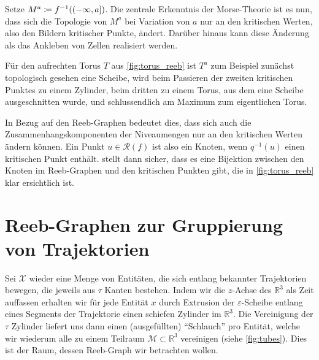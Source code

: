 Setze $M^a \coloneqq f^{-1}\enbrace*{(-\infty,a]}$.
Die zentrale Erkenntnis der Morse-Theorie ist es nun, dass sich die Topologie von $M^a$ bei Variation von $a$ nur an den kritischen Werten, also den Bildern kritischer Punkte, ändert.
Darüber hinaus kann diese Änderung als das Ankleben von Zellen realisiert werden.

Für den aufrechten Torus $T$ aus \cref{fig:torus_reeb} ist $T^a$ zum Beispiel zunächst topologisch gesehen eine Scheibe, wird beim Passieren der zweiten kritischen Punktes zu einem Zylinder, beim dritten zu einem Torus, aus dem eine Scheibe ausgeschnitten wurde, und schlussendlich am Maximum zum eigentlichen Torus.

In Bezug auf den Reeb-Graphen bedeutet dies, dass sich auch die Zusammenhangskomponenten der Niveaumengen nur an den kritischen Werten ändern können.
Ein Punkt $u \in \mathcal{R}(f)$ ist also ein Knoten, wenn $q^{-1}(u)$ einen kritischen Punkt enthält.
 stellt dann sicher, dass es eine Bijektion zwischen den Knoten im Reeb-Graphen und den kritischen Punkten gibt, die in \cref{fig:torus_reeb} klar ersichtlich ist.



\section{Reeb-Graphen zur Gruppierung von Trajektorien} %
\label{sec:trajek_reeb}
Sei $\mathcal{X}$ wieder eine Menge von Entitäten, die sich entlang bekannter Trajektorien bewegen, die jeweils aus $\tau$ Kanten bestehen.
Indem wir die $z$-Achse des $\mathbb{R}^3$ als Zeit auffassen erhalten wir für jede Entität $x$ durch Extrusion der $\varepsilon$-Scheibe entlang eines Segments der Trajektorie einen schiefen Zylinder im $\mathbb{R}^3$.
Die Vereinigung der $\tau$ Zylinder liefert uns dann einen (ausgefüllten) \enquote{Schlauch} pro Entität, welche wir wiederum alle zu einem Teilraum $\mathcal{M} \subset \mathbb{R}^3$ vereinigen (siehe \cref{fig:tubes}).
Dies ist der Raum, dessen Reeb-Graph wir betrachten wollen.

